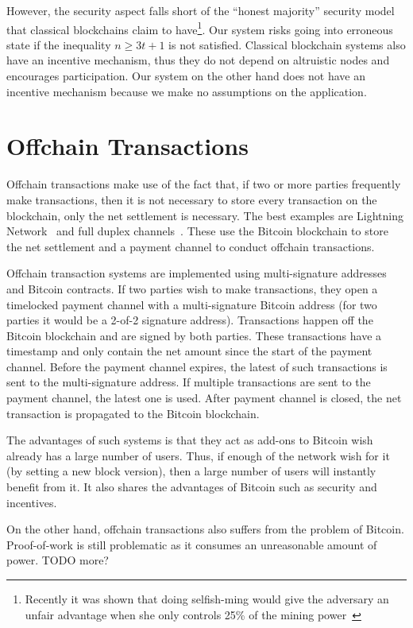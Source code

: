 However, the security aspect falls short of the ``honest majority'' security model that classical blockchains claim to 
have\footnote{Recently it was shown that doing selfish-ming would give the adversary an unfair advantage when she only controls 25\% of the mining power~\cite{eyal2014majority}}.
Our system risks going into erroneous state if the inequality $n \ge 3t + 1$ is not satisfied.
Classical blockchain systems also have an incentive mechanism, thus they do not depend on altruistic nodes and encourages participation.
Our system on the other hand does not have an incentive mechanism because we make no assumptions on the application.

\section{Offchain Transactions}
Offchain transactions make use of the fact that, if two or more parties frequently make transactions,
then it is not necessary to store every transaction on the blockchain, only the net settlement is necessary.
The best examples are Lightning Network~\cite{lightningnetwork} and full duplex channels~\cite{decker2015fast}.
These use the Bitcoin blockchain to store the net settlement and a payment channel to conduct offchain transactions.

Offchain transaction systems are implemented using multi-signature addresses~\cite{bitcoinmultisig} and Bitcoin contracts.
If two parties wish to make transactions, they open a timelocked payment channel with a multi-signature Bitcoin address (for two parties it would be a 2-of-2 signature address).
Transactions happen off the Bitcoin blockchain and are signed by both parties.
These transactions have a timestamp and only contain the net amount since the start of the payment channel.
Before the payment channel expires, the latest of such transactions is sent to the multi-signature address.
If multiple transactions are sent to the payment channel, the latest one is used.
After payment channel is closed, the net transaction is propagated to the Bitcoin blockchain.

The advantages of such systems is that they act as add-ons to Bitcoin wish already has a large number of users.
Thus, if enough of the network wish for it (by setting a new block version),
then a large number of users will instantly benefit from it.
It also shares the advantages of Bitcoin such as security and incentives.

On the other hand, offchain transactions also suffers from the problem of Bitcoin.
Proof-of-work is still problematic as it consumes an unreasonable amount of power.
TODO more?

